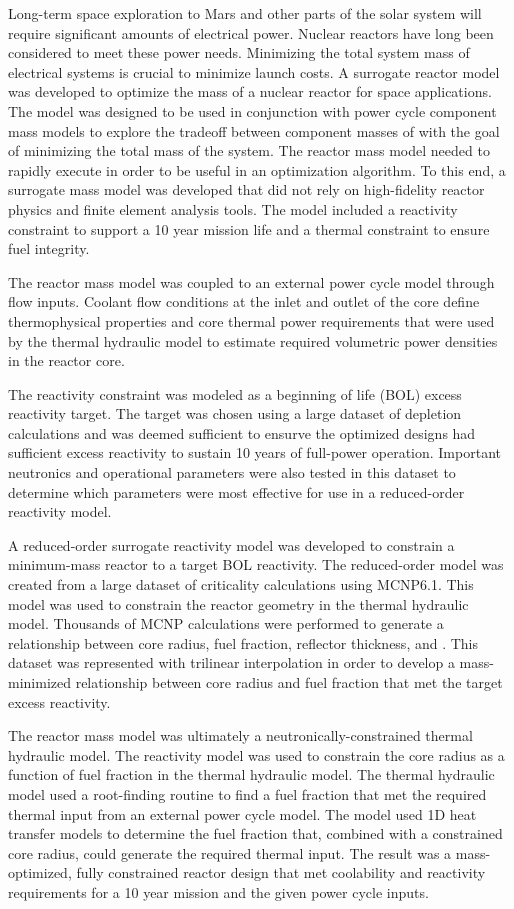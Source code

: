 Long-term space exploration to Mars and other parts of the solar system will
require significant amounts of electrical power. Nuclear reactors have long been
considered to meet these power needs. Minimizing the total system mass of
electrical systems is crucial to minimize launch costs. A surrogate reactor
model was developed to optimize the mass of a nuclear reactor for space
applications. The model was designed to be used in conjunction with power cycle
component mass models to explore the tradeoff between component masses of 
with the goal of minimizing the total mass of the system. The
reactor mass model needed to rapidly execute in order to be useful in an
optimization algorithm. To this end, a surrogate mass model was developed that
did not rely on high-fidelity reactor physics and finite element analysis tools.
The model included a reactivity constraint to support a 10 year mission life and
a thermal constraint to ensure fuel integrity.

The reactor mass model was coupled to an external power cycle model through flow
inputs. Coolant flow conditions at the inlet and outlet of the core define
thermophysical properties and core thermal power requirements that were used by
the thermal hydraulic model to estimate required volumetric power densities in
the reactor core.

The reactivity constraint was modeled as a beginning of life (BOL) excess reactivity
target. The target was chosen using a large dataset of depletion calculations
and was deemed sufficient to ensurve the optimized designs had sufficient excess reactivity
to sustain 10 years of full-power operation. Important neutronics and operational
parameters were also tested in this dataset to determine which parameters were
most effective for use in a reduced-order reactivity model.

A reduced-order surrogate reactivity model was developed to constrain a
minimum-mass reactor to a target BOL reactivity. The reduced-order model was
created from a large dataset of criticality calculations using MCNP6.1. This
model was used to constrain the reactor geometry in the thermal hydraulic model.
Thousands of MCNP \keff calculations were performed to generate a relationship
between core radius, fuel fraction, reflector thickness, and \keff. This dataset
was represented with trilinear interpolation in order to develop a
mass-minimized relationship between core radius and fuel fraction that met the
target excess reactivity.

The reactor mass model was ultimately a neutronically-constrained thermal
hydraulic model. The reactivity model was used to constrain the core radius as
a function of fuel fraction in the thermal hydraulic model. The thermal
hydraulic model used a root-finding routine to find a fuel fraction that met
the required thermal input from an external power cycle model. The model used 1D
heat transfer models to determine the fuel fraction that, combined with a constrained
core radius, could generate the required thermal input. The result was a
mass-optimized, fully constrained reactor design that met coolability and reactivity
requirements for a 10 year mission and the given power cycle inputs.
